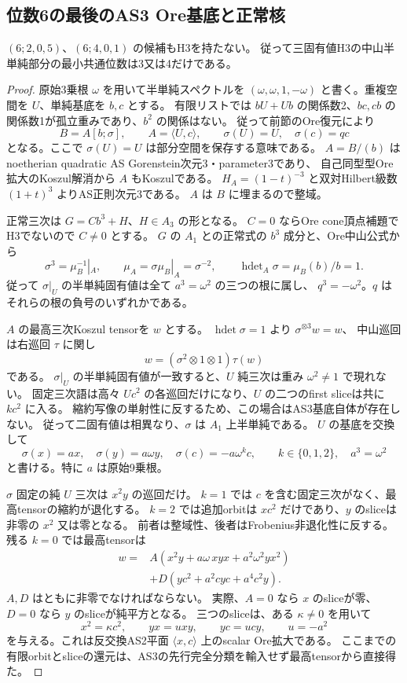 \subsection{位数6の最後のAS3 Ore基底と正常核}
\label{subsec:cubic-sixth-root-last-Ore}
\begin{theorem}[位数6の残る二スペクトルの全排除]
\label{thm:cubic-sixth-root-last-empty}
$(6;2,0,5)$、$(6;4,0,1)$ の候補もH3を持たない。
従って三固有値H3の中山半単純部分の最小共通位数は3又は4だけである。
\end{theorem}
\begin{proof}
原始3乗根 $\omega$ を用いて半単純スペクトルを
$(\omega,\omega,1,-\omega)$ と書く。重複空間を $U$、単純基底を $b,c$ とする。
有限リストでは $bU+Ub$ の関係数2、$bc,cb$ の関係数1が孤立重みであり、$b^2$ の関係はない。
従って前節のOre復元により
\[
 B=A[b;\sigma],\qquad A=\langle U,c\rangle,
 \qquad\sigma(U)=U,\quad\sigma(c)=q c
\]
となる。ここで $\sigma(U)=U$ は部分空間を保存する意味である。
$A=B/(b)$ はnoetherian quadratic AS Gorenstein次元3・parameter3であり、
自己同型型Ore拡大のKoszul解消から $A$ もKoszulである。
$H_A=(1-t)^{-3}$ と双対Hilbert級数 $(1+t)^3$ よりAS正則次元3である。
$A$ は $B$ に埋まるので整域。

正常三次は $G=C b^3+H$、$H\in A_3$ の形となる。
$C=0$ ならOre cone頂点補題でH3でないので $C\ne0$ とする。
$G$ の $A_1$ との正常式の $b^3$ 成分と、Ore中山公式から
\[
 \sigma^3=\mu_B^{-1}|_A,\qquad
 \mu_A=\sigma\mu_B|_A=\sigma^{-2},\qquad
 \operatorname{hdet}_A\sigma=\mu_B(b)/b=1.
\]
従って $\sigma|_U$ の半単純固有値は全て $a^3=\omega^2$ の三つの根に属し、
$q^3=-\omega^2$。$q$ はそれらの根の負号のいずれかである。

$A$ の最高三次Koszul tensorを $w$ とする。
$\operatorname{hdet}\sigma=1$ より $\sigma^{\otimes3}w=w$、
中山巡回は右巡回 $\tau$ に関し
\[
 w=(\sigma^2\otimes1\otimes1)\tau(w)
\]
である。
$\sigma|_U$ の半単純固有値が一致すると、$U$ 純三次は重み $\omega^2\ne1$ で現れない。
固定三次語は高々 $Uc^2$ の各巡回だけになり、$U$ の二つのfirst sliceは共に $kc^2$ に入る。
縮約写像の単射性に反するため、この場合はAS3基底自体が存在しない。
従って二固有値は相異なり、$\sigma$ は $A_1$ 上半単純である。
$U$ の基底を交換して
\[
 \sigma(x)=a x,\quad\sigma(y)=a\omega y,\quad
 \sigma(c)=-a\omega^k c,\qquad k\in\{0,1,2\},\quad a^3=\omega^2
\]
と書ける。特に $a$ は原始9乗根。

$\sigma$ 固定の純 $U$ 三次は $x^2y$ の巡回だけ。
$k=1$ では $c$ を含む固定三次がなく、最高tensorの縮約が退化する。
$k=2$ では追加orbitは $xc^2$ だけであり、$y$ のsliceは非零の $x^2$ 又は零となる。
前者は整域性、後者はFrobenius非退化性に反する。
残る $k=0$ では最高tensorは
\[
\begin{split}
 w={}&A(x^2y+a\omega\,xyx+a^2\omega^2yx^2)\\
     &+D(yc^2+a^2cyc+a^4c^2y).
\end{split}
\]
$A,D$ はともに非零でなければならない。
実際、$A=0$ なら $x$ のsliceが零、$D=0$ なら $y$ のsliceが純平方となる。
三つのsliceは、ある $\kappa\ne0$ を用いて
\[
 x^2=\kappa c^2,\qquad yx=u xy,\qquad yc=u cy,
 \qquad u=-a^2
\]
を与える。これは反交換AS2平面 $\langle x,c\rangle$ 上のscalar Ore拡大である。
ここまでの有限orbitとsliceの還元は、AS3の先行完全分類を輸入せず最高tensorから直接得た。


\end{proof}
